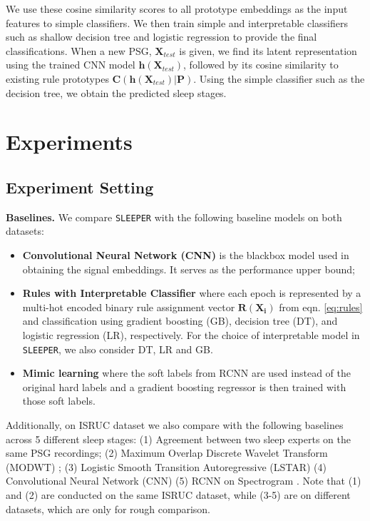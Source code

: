 \documentclass[pmlr]{jmlr}
\newcommand{\mname}
{\texttt{SLEEPER}\xspace}
\begin{document}
 We use these cosine similarity scores  to all prototype embeddings as the input features to simple classifiers. We then train simple and interpretable classifiers such as shallow decision tree and logistic regression to provide the final classifications. When a new PSG, $\bm{X}_{test}$ is given, we find its latent representation using the trained CNN model $\bm{h}(\bm{X}_{test})$, followed by its cosine similarity to existing rule prototypes $\bm{C}(\bm{h}(\bm{X}_{test})|\bm{P})$. Using the simple classifier such as the decision tree, we obtain the predicted sleep stages.\section{Experiments} 
\subsection{Experiment Setting} 

\noindent\textbf{Baselines.} 
We compare \mname with the following baseline models on both datasets: 
\begin{itemize}
    \item \textbf{Convolutional Neural Network (CNN)}  is the blackbox model used in obtaining the signal embeddings. It serves as the performance upper bound;
    \item \textbf{Rules with Interpretable Classifier} where each epoch is represented by a multi-hot encoded binary rule assignment vector $\bm{R} (\bm{X_i})$ from eqn. \ref{eq:rules} and classification using gradient boosting (GB), decision tree (DT), and logistic regression (LR), respectively.  For the choice of interpretable model in  \mname, we also consider DT, LR and GB.
    \item \textbf{Mimic learning} \citep{mimic} where the soft labels from RCNN are used instead of the original hard labels and a gradient boosting regressor is then trained with those soft labels. 
\end{itemize}


Additionally, on ISRUC dataset we also compare with the following baselines across 5 different sleep stages: (1) Agreement between two sleep experts on the same PSG recordings; (2) Maximum Overlap Discrete Wavelet Transform (MODWT) \citep{isruc, khalighi}; (3) Logistic Smooth Transition Autoregressive (LSTAR) \citep{lstar} (4) Convolutional Neural Network (CNN) \citep{chambon2018deep} (5) RCNN on Spectrogram \citep{10.1093/jamia/ocy131}. Note that (1) and (2) are conducted on the same ISRUC dataset, while (3-5) are on different datasets, which are only for rough comparison.\\
 
\end{document}
